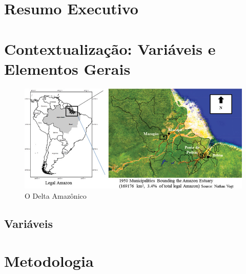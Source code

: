 \documentclass[12pt,a4paper,oneside]{erdc}
\begin{document}







\maketitle

\tableofcontents


\chapter*{Resumo Executivo}

  \lipsum[12-13]

\mainmatter


\chapter{Contextualização: Variáveis e Elementos Gerais}
		

  \lipsum[12-13]
   \cite{DeLima2018}	
	  		
\begin{figure}
\centering
\includegraphics[width=\linewidth]{../figs/VogtEtAl2015}
\caption{O Delta Amazônico}
\label{fig:vogtetal2015}
\end{figure}

  \lipsum[12-13]
  
  
\section{Variáveis}

  \lipsum[12-13]



\chapter{Metodologia}
\end{document}
